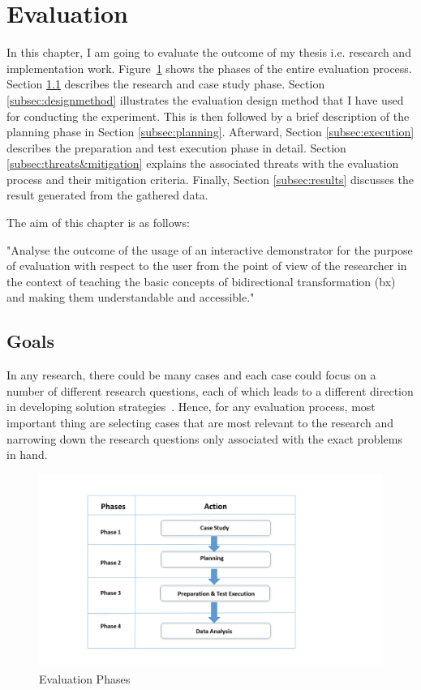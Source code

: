 \section{Evaluation}\label{sec:evaluation} 
In this chapter, I am going to evaluate the outcome of my thesis i.e. research and implementation work. 
Figure~\ref{fig:Evaluation_Phases} shows the phases of the entire evaluation process. Section \ref{subsec:goals} describes the research and case study phase. Section \ref{subsec:designmethod} illustrates the evaluation design method that I have used for conducting the experiment. This is then followed by a brief description of the planning phase in Section \ref{subsec:planning}. Afterward, Section \ref{subsec:execution} describes the preparation and test execution phase in detail. Section \ref{subsec:threats&mitigation} explains the associated threats with the evaluation process and their mitigation criteria. Finally, Section \ref{subsec:results} discusses the result generated from the gathered data. 

The aim of this chapter is as follows: 

"Analyse the outcome of the usage of an interactive demonstrator for the purpose of evaluation with respect to the user from the point of view of the researcher in the context of teaching the basic concepts of bidirectional transformation (bx) and making them understandable and accessible."

\subsection{Goals}\label{subsec:goals}  
In any research, there could be many cases and each case could focus on a number of different research questions, each of which leads to a different direction in developing solution strategies~\cite{semethods}. Hence, for any evaluation process, most important thing are selecting cases that are most relevant to the research and narrowing down the research questions only associated with the exact problems in hand. 

\begin{figure}
	\includegraphics[width=1\textwidth]{figures/Evaluation_Phases}
	\caption{Evaluation Phases}
	\label{fig:Evaluation_Phases}
\end{figure}

